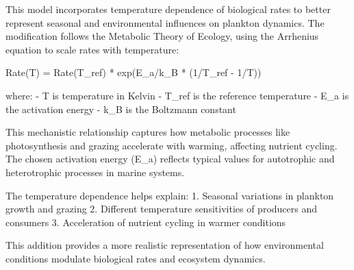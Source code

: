 This model incorporates temperature dependence of biological rates to better represent seasonal and environmental influences on plankton dynamics. The modification follows the Metabolic Theory of Ecology, using the Arrhenius equation to scale rates with temperature:

Rate(T) = Rate(T_ref) * exp(E_a/k_B * (1/T_ref - 1/T))

where:
- T is temperature in Kelvin
- T_ref is the reference temperature
- E_a is the activation energy
- k_B is the Boltzmann constant

This mechanistic relationship captures how metabolic processes like photosynthesis and grazing accelerate with warming, affecting nutrient cycling. The chosen activation energy (E_a) reflects typical values for autotrophic and heterotrophic processes in marine systems.

The temperature dependence helps explain:
1. Seasonal variations in plankton growth and grazing
2. Different temperature sensitivities of producers and consumers
3. Acceleration of nutrient cycling in warmer conditions

This addition provides a more realistic representation of how environmental conditions modulate biological rates and ecosystem dynamics.
